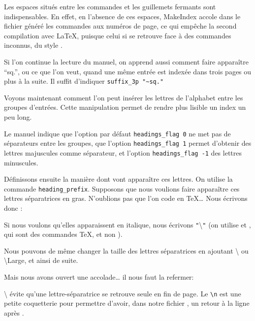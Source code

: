 \begin{attention}
Les espaces situés entre les commandes et les guillemets fermants sont indispensables. En effet, en l'absence de ces espaces, MakeIndex accole dans le fichier  généré les commandes aux numéros de page, ce qui empêche la second compilation avec \LaTeX, puisque celui si se retrouve face à des commandes inconnus, du style .
\end{attention}

Si l'on continue la lecture du manuel, on apprend aussi comment faire apparaître \enquote{sq.}, ou ce que l'on veut, quand une même entrée est indexée dans trois pages ou plus à la suite. Il suffit d'indiquer \verb+suffix_3p "~sq."+

Voyons maintenant comment l'on peut insérer les lettres de l'alphabet entre les groupes d'entrées. Cette manipulation permet de rendre plus lisible un index un peu long. 

Le manuel indique que l'option par défaut \verb+headings_flag 0+ ne met pas de séparateurs entre les groupes, que l'option \verb+headings_flag 1+ permet d'obtenir des lettres majuscules comme séparateur, et l'option  \verb+headings_flag -1+ des lettres minuscules.

Définissons ensuite la manière dont vont apparaître ces lettres. On utilise la commande \verb|heading_prefix|. Supposons que nous voulions faire apparaître ces lettres séparatrices en gras. N'oublions pas que l'on code en \TeX … Nous écrivons donc :

\begin{latexcode}
heading_prefix "{\\bf "
\end{latexcode} 

Si nous voulons qu'elles apparaissent en italique, nous écrivons \verb|"|\textbackslash{}\verb|"| (on utilise  et , qui sont des commandes \TeX, et non  ).

Nous  pouvons de même changer la taille des lettres séparatrices en ajoutant \textbackslash{} ou \cs\textbackslash{Large}, et ainsi de suite. 

Mais nous avons ouvert une accolade… il nous faut la refermer:

\begin{latexcode}
heading_suffix " }\\nopagebreak\n " 
\end{latexcode}

\textbackslash{} évite qu'une lettre-séparatrice se retrouve seule en fin de page. Le \verb|\n| est une petite coquetterie pour permettre d'avoir, dans notre fichier , un retour à la ligne après .



